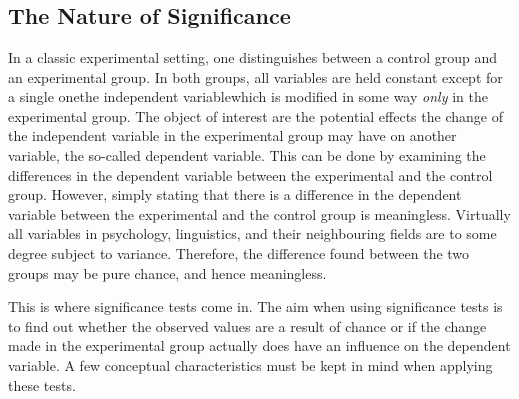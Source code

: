 
\newcommand{\pv}{\textit{p}-value}


\chapter{\significance}
\label{ch:sig}

\section{The Nature of Significance}
\label{sec:signat}
In a classic experimental setting, one distinguishes between a control group and an experimental group.
In both groups, all variables are held constant except for a single one\dash the independent variable\dash which is modified in some way \emph{only} in the experimental group.
The object of interest are the potential effects the change of the independent variable in the experimental group may have on another variable, the so-called dependent variable.
This can be done by examining the differences in the dependent variable between the experimental and the control group.
However, simply stating that there is a difference in the dependent variable between the experimental and the control group is meaningless.
Virtually all variables in psychology, linguistics, and their neighbouring fields are to some degree subject to variance.
Therefore, the difference found between the two groups may be pure chance, and hence meaningless.

This is where significance tests come in.
The aim when using significance tests is to find out whether the observed values are a result of chance or if the change made in the experimental group actually does have an influence on the dependent variable.
A few conceptual characteristics must be kept in mind when applying these tests.

